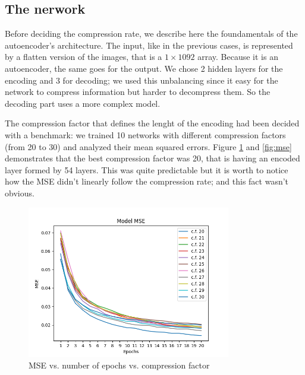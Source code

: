 \documentclass[compsoc]{IEEEtran}
\begin{document}
\subsection{The nerwork}
Before deciding the compression rate, we describe here the foundamentals of the autoencoder's architecture. The input, like in the previous cases, is represented by a flatten version of the images, that is a $1\times1092$ array. Because it is an autoencoder, the same goes for the output. We chose 2 hidden layers for the encoding and 3 for decoding; we used this unbalancing since it easy for the network to compress information but harder to decompress them. So the decoding part uses a more complex model.\par
The compression factor that defines the lenght of the encoding had been decided with a benchmark: we trained 10 networks with different compression factors (from 20 to 30) and analyzed their mean squared errors. Figure \ref{fig:multiacc} and \ref{fig:mse} demonstrates that the best compression factor was 20, that is having an encoded layer formed by 54 layers. This was quite predictable but it is worth to notice how the MSE didn't linearly follow the compression rate; and this fact wasn't obvious.\par



\begin{figure}[ht!]
\centering                                                                        
\includegraphics[width=3.5in]{multiacc.png}
\captionsetup{justification=centering}                                                                                         
\caption{MSE vs. number of epochs vs. compression factor}
\label{fig:multiacc}
\end{figure}
\end{document}

